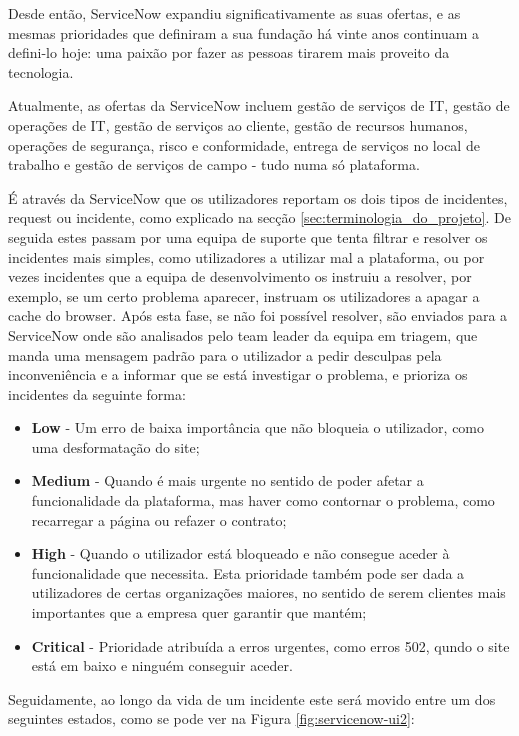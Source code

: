         Desde então, ServiceNow expandiu significativamente as suas ofertas, e as mesmas prioridades que definiram a sua fundação há vinte anos continuam a defini-lo hoje: uma paixão por fazer as pessoas tirarem mais proveito da tecnologia. 
        
        Atualmente, as ofertas da ServiceNow incluem gestão de serviços de IT, gestão de operações de IT, gestão de serviços ao cliente, gestão de recursos humanos, operações de segurança, risco e conformidade, entrega de serviços no local de trabalho e gestão de serviços de campo - tudo numa só plataforma.

        É através da ServiceNow que os utilizadores reportam os dois tipos de incidentes, request ou incidente, como explicado na secção \ref{sec:terminologia_do_projeto}. De seguida estes passam por uma equipa de suporte que tenta filtrar e resolver os incidentes mais simples, como utilizadores a utilizar mal a plataforma, ou por vezes incidentes que a equipa de desenvolvimento os instruiu a resolver, por exemplo, se um certo problema aparecer, instruam os utilizadores a apagar a cache do browser. Após esta fase, se não foi possível resolver, são enviados para a ServiceNow onde são analisados pelo team leader da equipa em triagem, que manda uma mensagem padrão para o utilizador a pedir desculpas pela inconveniência e a informar que se está investigar o problema, e prioriza os incidentes da seguinte forma:
        \begin{itemize}
            \item \textbf{Low} - Um erro de baixa importância que não bloqueia o utilizador, como uma desformatação do site;
            \item \textbf{Medium} - Quando é mais urgente no sentido de poder afetar a funcionalidade da plataforma, mas haver como contornar o problema, como recarregar a página ou refazer o contrato;
            \item \textbf{High} - Quando o utilizador está bloqueado e não consegue aceder à funcionalidade que necessita. Esta prioridade também pode ser dada a utilizadores de certas organizações maiores, no sentido de serem clientes mais importantes que a empresa quer garantir que mantém;
            \item \textbf{Critical} - Prioridade atribuída a erros urgentes, como erros 502, qundo o site está em baixo e ninguém conseguir aceder.
        \end{itemize}
        Seguidamente, ao longo da vida de um incidente este será movido entre um dos seguintes estados, como se pode ver na Figura \ref{fig:servicenow-ui2}:
